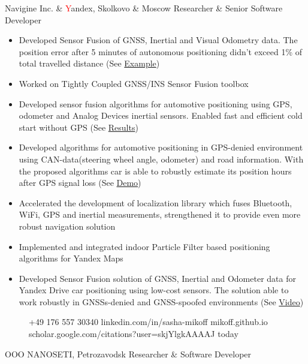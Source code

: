 \documentclass{tccv}
\begin{document}
\begin{eventlist}
     {\textcolor{blue(ncs)}{N}avigine Inc. \& \textcolor{red}{Y}andex, Skolkovo \& Moscow}
     {Researcher \& Senior Software Developer}
\begin{itemize}
    \item Developed Sensor Fusion of GNSS, Inertial and Visual Odometry data. The position error after 5 minutes of autonomous positioning didn't exceed 1\% of total travelled distance (See  \href{https://www.dropbox.com/s/kaij23xphdqjv5j/kalman_heading_correction_on.html?dl=1}{Example})
    \item Worked on Tightly Coupled GNSS/INS Sensor Fusion toolbox
    \item Developed sensor fusion algorithms for automotive positioning using GPS, odometer and Analog Devices inertial sensors. Enabled fast and efficient cold start without GPS (See \href{https://www.dropbox.com/s/yjag8qm7ax6skoa/vehicle_positioning_demo.pptx}{Results})
    \item Developed algorithms for automotive positioning in GPS-denied environment using CAN-data(steering wheel angle, odometer) and road information. With the proposed algorithms car is able to robustly estimate its position hours after GPS signal loss (See \href{https://www.dropbox.com/s/awil97l95az982h/AutotomotiveCanFusion.png}{Demo})
    \item Accelerated the development of localization library  which fuses Bluetooth, WiFi, GPS and inertial measurements, strengthened it to provide even more robust navigation solution
    \item Implemented and integrated indoor Particle Filter based positioning algorithms for Yandex Maps
    \item Developed Sensor Fusion solution of GNSS, Inertial and Odometer data for Yandex Drive car positioning using low-cost sensors. The solution able to work robustly in GNSSs-denied and GNSS-spoofed environments (See \href{https://www.dropbox.com/s/jkawevakrhy58hc/LefortovskiyFast.mp4}{Video})
\end{itemize}

\begin{figure}[t]
    {+49 176 557 30340}
    {} %
    {linkedin.com/in/sasha-mikoff}
    {mikoff.github.io}
    {scholar.google.com/citations?user=skjYlgkAAAAJ}
    {today}
\end{figure}

     {OOO NANOSETI, Petrozavodsk}
     {Researcher \& Software Developer}
     

\end{eventlist}
\end{document}
